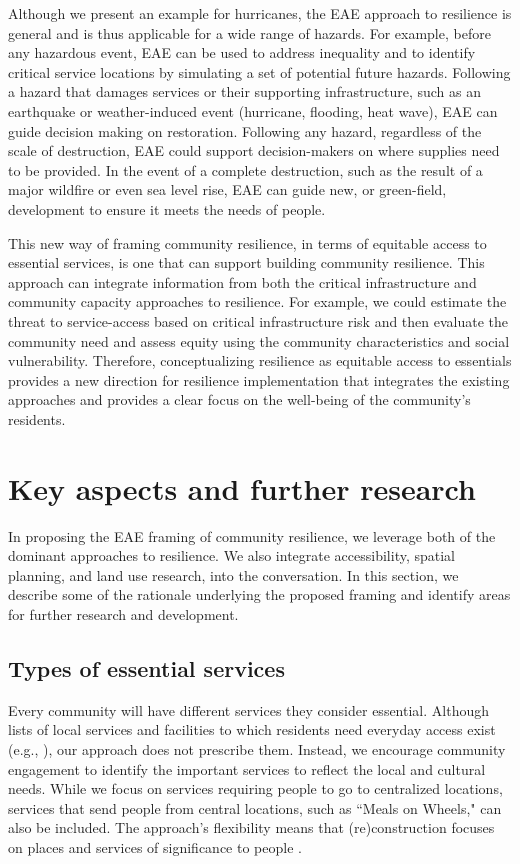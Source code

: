 \documentclass[onecolumn,doublespacing]{risa}
\let \citeA \textcite
\let \cite \parencite
\begin{document}
Although we present an example for hurricanes, the EAE approach to resilience is general and is thus applicable for a wide range of hazards. 
For example, before any hazardous event, EAE can be used to address inequality and to identify critical service locations by simulating a set of potential future hazards. 
Following a hazard that damages services or their supporting infrastructure, such as an earthquake or weather-induced event (hurricane, flooding, heat wave), EAE can guide decision making on restoration.
Following any hazard, regardless of the scale of destruction, EAE could support decision-makers on where supplies need to be provided.
In the event of a complete destruction, such as the result of a major wildfire or even sea level rise, EAE can guide new, or green-field, development to ensure it meets the needs of people.

This new way of framing community resilience, in terms of equitable access to essential services, is one that can support building community resilience.
This approach can integrate information from both the critical infrastructure and community capacity approaches to resilience.
For example, we could estimate the threat to service-access based on critical infrastructure risk and then evaluate the community need and assess equity using 
the community characteristics and social vulnerability.
Therefore, conceptualizing resilience as equitable access to essentials provides a new direction for resilience implementation that integrates the existing approaches and provides a clear focus on the well-being of the community's residents.

\section{Key aspects and further research}
In proposing the EAE framing of community resilience, we leverage both of the dominant approaches to resilience. 
We also integrate accessibility, spatial planning, and land use research, into the conversation.
In this section, we describe some of the rationale underlying the proposed framing and identify areas for further research and development.

\subsection{Types of essential services}
Every community will have different services they consider essential.
Although lists of local services and facilities to which residents need everyday access exist (e.g., \citeA{Dempsey2011-og}), our approach does not prescribe them.
Instead, we encourage community engagement to identify the important services to reflect the local and cultural needs.
While we focus on services requiring people to go to centralized locations, services that send people from central locations, such as ``Meals on Wheels," can also be included.
The approach's flexibility means that (re)construction focuses on places and services of significance to people \cite{United_Nations_Educational_Scientific_and_Cultural_Organization2018-sf}.
\end{document}
